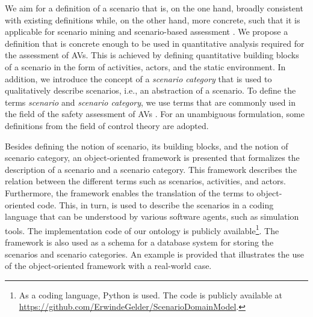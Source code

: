 We aim for a definition of a scenario that is, on the one hand, broadly consistent with existing definitions \autocite{geyer2014, ulbrich2015, elrofai2016scenario} while, on the other hand, more concrete, such that it is applicable for scenario mining \autocite{elrofai2016scenario} and scenario-based assessment \autocite{stellet2015taxonomy, deGelder2017assessment, pegasus2019}. We propose a definition that is concrete enough to be used in quantitative analysis required for the assessment of AVs. This is achieved by defining quantitative building blocks of a scenario in the form of activities, actors, and the static environment. In addition, we introduce the concept of a \emph{scenario category}  
that is used to qualitatively describe scenarios, i.e., an abstraction of a scenario. 
\cstart To define the terms \emph{scenario} and \emph{scenario category}, we use terms that are commonly used in the field of the safety assessment of AVs \autocite{geyer2014, ulbrich2015, catapult2018musicc, catapult2018regulating, sigsim2019glossary, openscenario}. For an unambiguous formulation, some definitions from the field of control theory are adopted.\cend


Besides defining the notion of scenario, its building blocks, and the notion of scenario category, an \cstartb object-oriented framework \cendb is presented that formalizes the description of a scenario and a scenario category. 
This \cstartb framework \cendb describes the relation between the different terms such as scenarios, activities, and actors.
Furthermore, the \cstartb framework \cendb enables the translation of the terms to object-oriented code.
This, in turn, is used to describe the scenarios in a coding language that can be understood by various software agents, such as simulation tools. 
The implementation code of our ontology is publicly available\footnote{As a coding language, Python is used. The code is publicly available at \url{https://github.com/ErwindeGelder/ScenarioDomainModel}.}. 
The \cstartb framework \cendb is also used as a schema for a database system for storing the scenarios and scenario categories.
An example is provided that illustrates the use of the \cstartb object-oriented framework \cendb with a real-world case.


